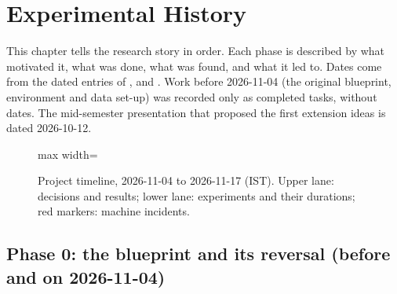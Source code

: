 \chapter{Experimental History}\label{ch:history}

This chapter tells the research story in order. Each phase is described by what motivated it, what was done, what was
found, and what it led to. Dates come from the dated entries of ,  and
. Work before 2026-11-04 (the original blueprint, environment and data set-up) was recorded only
as completed tasks, without dates. The mid-semester presentation that proposed the first extension ideas is dated
2026-10-12.

\begin{figure}[htbp]
\centering
\begin{adjustbox}{max width=\linewidth}\end{adjustbox}
\caption{Project timeline, 2026-11-04 to 2026-11-17 (IST). Upper lane: decisions and results; lower lane: experiments
and their durations; red markers: machine incidents.}
\label{fig:timeline}
\end{figure}

\section{Phase 0: the blueprint and its reversal (before and on 2026-11-04)}

